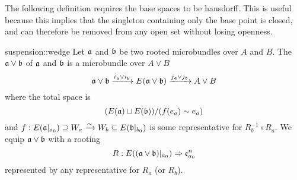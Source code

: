 \begin{myparagraph}
    The following definition requires the base spaces to be hausdorff.
    This is useful because this implies that the singleton containing only the base point is closed,
    and can therefore be removed from any open set without losing openness.  
\end{myparagraph}

\begin{mydefinition}{suspension::wedge}
    Let $\mathfrak{a}$ and $\mathfrak{b}$ be two rooted microbundles over $A$ and $B$.
    The  $\mathfrak{a} \vee \mathfrak{b}$ of $\mathfrak{a}$ and $\mathfrak{b}$ is a microbundle over $A \vee B$
    \[ \mathfrak{a} \vee \mathfrak{b} \xrightarrow{i_{\mathfrak{a}} \vee i_{\mathfrak{b}}} E(\mathfrak{a} \vee \mathfrak{b}) \xrightarrow{j_{\mathfrak{a}} \vee j_{\mathfrak{b}}} A \vee B \]
    where the total space is
    \[ (E(\mathfrak{a}) \sqcup E(\mathfrak{b})) / (f(e_a) \sim e_a) \]
    and $f: E(\mathfrak{a}\vert_{a_0}) \supseteq{} W_a \xrightarrow{\sim} W_b \subseteq{} E(\mathfrak{b}\vert_{b_0})$ is some representative for $R_b^{-1} \circ R_a$.
    We equip $\mathfrak{a} \vee \mathfrak{b}$ with a rooting
    \[ R: E((\mathfrak{a} \vee \mathfrak{b})\vert_{a_0}) \Rightarrow{} \mathfrak{e}^{n}_{a_0} \]
    represented by any representative for $R_a$ (or $R_b$).
\end{mydefinition}
